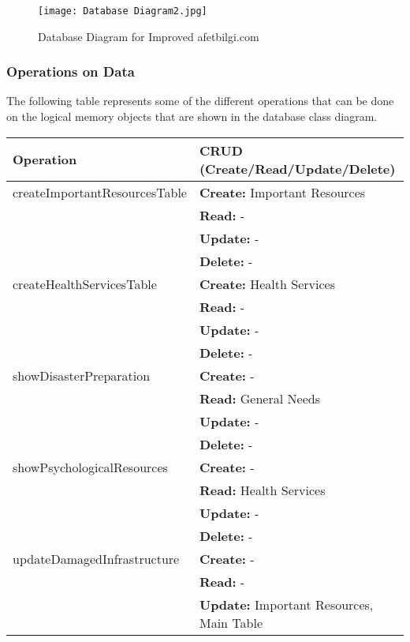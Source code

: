 \documentclass[12pt, letterpaper]{article}
\begin{document}
\begin{figure}[H]
\centering
\texttt{[image: Database Diagram2.jpg]}
\caption{Database Diagram for Improved afetbilgi.com}
\end{figure}

\newpage

\subsubsection{Operations on Data} %

The following table represents some of the different operations that can be done on the logical memory objects that are shown in the database class diagram.

\begin{table}[H]
\centering
\begin{tabularx}{\textwidth}{|X|p{10cm}|}
\hline
\textbf{Operation} & \textbf{CRUD (Create/Read/Update/Delete)} \\
\hline
     createImportantResourcesTable & \textbf{Create:} Important Resources \\
     & \textbf{Read:} - \\
     & \textbf{Update:} - \\
     & \textbf{Delete:} - \\
\hline
     createHealthServicesTable & \textbf{Create:} Health Services \\
     & \textbf{Read:} - \\
     & \textbf{Update:} - \\
     & \textbf{Delete:} - \\
\hline
     showDisasterPreparation & \textbf{Create:} - \\
     & \textbf{Read:} General Needs \\
     & \textbf{Update:} - \\
     & \textbf{Delete:} - \\
\hline
     showPsychologicalResources & \textbf{Create:} - \\
     & \textbf{Read:} Health Services \\
     & \textbf{Update:} - \\
     & \textbf{Delete:} - \\
\hline
     updateDamagedInfrastructure & \textbf{Create:} - \\
     & \textbf{Read:} - \\
     & \textbf{Update:} Important Resources, Main Table \\

\end{tabularx}
\end{table}
\end{document}
